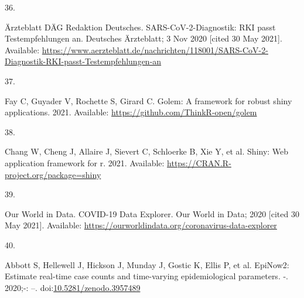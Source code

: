 \documentclass[10pt,letterpaper]{article} %
\newlength{\cslhangindent}
\newlength{\csllabelwidth}
\newlength{\cslentryspacingunit} %
\newenvironment{CSLReferences}[2] %
 {%
  \setlength{\parindent}{0pt}
  \ifodd #1
  \let\oldpar\par
  \def\par{\hangindent=\cslhangindent\oldpar}
  \fi
  \setlength{\parskip}{#2\cslentryspacingunit}
 }%
 {}
\newcommand{\CSLLeftMargin}[1]{\parbox[t]{\csllabelwidth}{#1}}
\newcommand{\CSLRightInline}[1]{\parbox[t]{\linewidth - \csllabelwidth}{#1}\break}
\providecommand{\DIFaddbegin}{} %
\providecommand{\DIFaddend}{} %
\providecommand{\DIFdelbegin}{} %
\providecommand{\DIFdelend}{} %
\newcommand{\DIFscaledelfig}{0.5}
\newlength{\DIFdelgraphicswidth} %
\newlength{\DIFdelgraphicsheight} %
\newcommand{\DIFaddincludegraphics}[2][]{{\color{blue}\fbox{\DIFOincludegraphics[#1]{#2}}}} %
\newcommand{\DIFdelincludegraphics}[2][]{%
\sbox{\DIFdelgraphicsbox}{\DIFOincludegraphics[#1]{#2}}%
\settoboxwidth{\DIFdelgraphicswidth}{\DIFdelgraphicsbox} %
\settoboxtotalheight{\DIFdelgraphicsheight}{\DIFdelgraphicsbox} %
\scalebox{\DIFscaledelfig}{%
\parbox[b]{\DIFdelgraphicswidth}{\usebox{\DIFdelgraphicsbox}\\[-\baselineskip] \rule{\DIFdelgraphicswidth}{0em}}\llap{\resizebox{\DIFdelgraphicswidth}{\DIFdelgraphicsheight}{%
\setlength{\unitlength}{\DIFdelgraphicswidth}%
\begin{picture}(1,1)%
\thicklines\linethickness{2pt} %
{\color[rgb]{1,0,0}\put(0,0){\framebox(1,1){}}}%
{\color[rgb]{1,0,0}\put(0,0){\line( 1,1){1}}}%
{\color[rgb]{1,0,0}\put(0,1){\line(1,-1){1}}}%
\end{picture}%
}\hspace*{3pt}}} %
} %
\DeclareRobustCommand{\DIFaddbegin}{\DIFOaddbegin \let\includegraphics\DIFaddincludegraphics} %
\DeclareRobustCommand{\DIFaddend}{\DIFOaddend \let\includegraphics\DIFOincludegraphics} %
\DeclareRobustCommand{\DIFdelbegin}{\DIFOdelbegin \let\includegraphics\DIFdelincludegraphics} %
\DeclareRobustCommand{\DIFdelend}{\DIFOaddend \let\includegraphics\DIFOincludegraphics} %
\begin{document}
\begin{CSLReferences}{0}{0}
\leavevmode{}%
\CSLLeftMargin{36. }
\DIFdelbegin %
\DIFdelend \DIFaddbegin \CSLRightInline{Ärzteblatt DÄG Redaktion Deutsches.
SARS-CoV-2-Diagnostik: RKI passt Testempfehlungen an. {Deutsches
Ärzteblatt}; 3 Nov 2020 {[}cited 30 May 2021{]}. Available:
\url{https://www.aerzteblatt.de/nachrichten/118001/SARS-CoV-2-Diagnostik-RKI-passt-Testempfehlungen-an}}
\DIFaddend 

\leavevmode{}%
\CSLLeftMargin{37. }
\DIFdelbegin %
\DIFdelend \DIFaddbegin \CSLRightInline{Fay C, Guyader V, Rochette S, Girard C. Golem: A
framework for robust shiny applications. 2021. Available:
\url{https://github.com/ThinkR-open/golem}}
\DIFaddend 

\leavevmode{}%
\CSLLeftMargin{38. }
\DIFdelbegin %
\DIFdelend \DIFaddbegin \CSLRightInline{Chang W, Cheng J, Allaire J, Sievert C, Schloerke B, Xie
Y, et al. Shiny: Web application framework for r. 2021. Available:
\url{https://CRAN.R-project.org/package=shiny}}
\DIFaddend 

\leavevmode{}%
\CSLLeftMargin{39. }
\DIFdelbegin %
\DIFdelend \DIFaddbegin \CSLRightInline{Our World in Data. {COVID-19 Data Explorer}. {Our World
in Data}; 2020 {[}cited 30 May 2021{]}. Available:
\url{https://ourworldindata.org/coronavirus-data-explorer}}
\DIFaddend 

\leavevmode{}%
\CSLLeftMargin{40. }
\DIFdelbegin %
\DIFdelend \DIFaddbegin \CSLRightInline{Abbott S, Hellewell J, Hickson J, Munday J, Gostic K,
Ellis P, et al. EpiNow2: Estimate real-time case counts and time-varying
epidemiological parameters. -. 2020;-: --.
doi:\href{https://doi.org/10.5281/zenodo.3957489}{10.5281/zenodo.3957489}}
\DIFaddend 


\end{CSLReferences}
\end{document}
